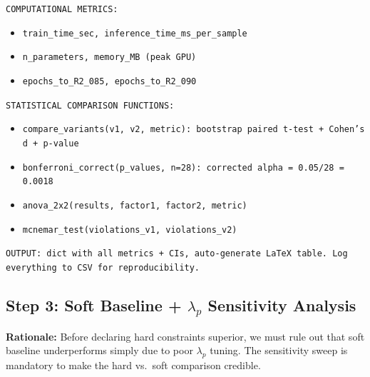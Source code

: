 \documentclass[12pt,a4paper]{article}
\begin{document}
\begin{promptbox}
\texttt{COMPUTATIONAL METRICS:}
\begin{itemize}[noitemsep]
  \item \texttt{train\_time\_sec, inference\_time\_ms\_per\_sample}
  \item \texttt{n\_parameters, memory\_MB (peak GPU)}
  \item \texttt{epochs\_to\_R2\_085, epochs\_to\_R2\_090}
\end{itemize}

\texttt{STATISTICAL COMPARISON FUNCTIONS:}
\begin{itemize}[noitemsep]
  \item \texttt{compare\_variants(v1, v2, metric): bootstrap paired
    t-test + Cohen's d + p-value}
  \item \texttt{bonferroni\_correct(p\_values, n=28): corrected alpha
    = 0.05/28 = 0.0018}
  \item \texttt{anova\_2x2(results, factor1, factor2, metric)}
  \item \texttt{mcnemar\_test(violations\_v1, violations\_v2)}
\end{itemize}

\texttt{OUTPUT: dict with all metrics + CIs, auto-generate LaTeX table.
Log everything to CSV for reproducibility.}
\end{promptbox}

\subsection{Step 3: Soft Baseline + $\lambda_p$ Sensitivity Analysis}

\begin{rationalebox}
\textbf{Rationale:} Before declaring hard constraints superior, we must
rule out that soft baseline underperforms simply due to poor $\lambda_p$
tuning. The sensitivity sweep is mandatory to make the hard vs.\ soft
comparison credible.
\end{rationalebox}
\end{document}
